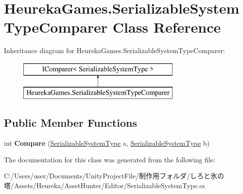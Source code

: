 \hypertarget{class_heureka_games_1_1_serializable_system_type_comparer}{}\section{Heureka\+Games.\+Serializable\+System\+Type\+Comparer Class Reference}
\label{class_heureka_games_1_1_serializable_system_type_comparer}
Inheritance diagram for Heureka\+Games.\+Serializable\+System\+Type\+Comparer\+:\begin{figure}[H]
\begin{center}
\leavevmode
\includegraphics[height=2.000000cm]{class_heureka_games_1_1_serializable_system_type_comparer}
\end{center}
\end{figure}
\subsection*{Public Member Functions}
\begin{DoxyCompactItemize}
\item 
\mbox{\label{class_heureka_games_1_1_serializable_system_type_comparer_ab7e2d66cbe457576d81704a81dc53410}} 
int {\bfseries Compare} (\hyperlink{class_heureka_games_1_1_serializable_system_type}{Serializable\+System\+Type} a, \hyperlink{class_heureka_games_1_1_serializable_system_type}{Serializable\+System\+Type} b)
\end{DoxyCompactItemize}


The documentation for this class was generated from the following file\+:\begin{DoxyCompactItemize}
\item 
C\+:/\+Users/user/\+Documents/\+Unity\+Project\+File/制作用フォルダ/しろと氷の塔/\+Assets/\+Heureka/\+Asset\+Hunter/\+Editor/Serializable\+System\+Type.\+cs\end{DoxyCompactItemize}
